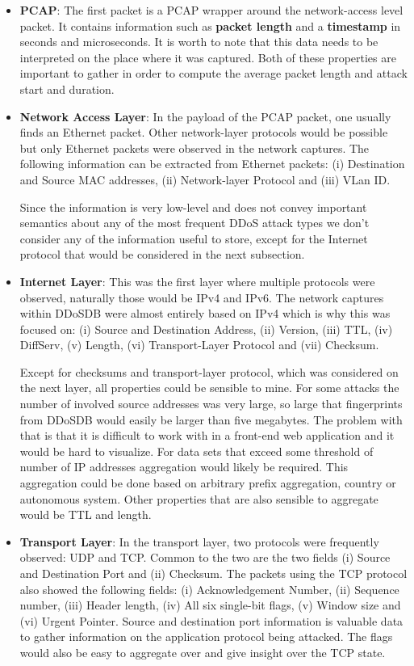 \begin{itemize}
\item \textbf{PCAP}:
The first packet is a PCAP wrapper around the network-access level packet. It contains information such as \textbf{packet length} and a \textbf{timestamp} in seconds and microseconds. It is worth to note that this data needs to be interpreted on the place where it was captured.
Both of these properties are important to gather in order to compute the average packet length and attack start and duration.

\item \textbf{Network Access Layer}: 
In the payload of the PCAP packet, one usually finds an Ethernet packet. Other network-layer protocols would be possible but only Ethernet packets were observed in the network captures.
The following information can be extracted from Ethernet packets:
(i) Destination and Source MAC addresses, (ii) Network-layer Protocol and (iii) VLan ID.

Since the information is very low-level and does not convey important semantics about any of the most frequent DDoS attack types we don't consider any of the information useful to store, except for the Internet protocol that would be considered in the next subsection.


\item \textbf{Internet Layer}: 
This was the first layer where multiple protocols were observed, naturally those would be IPv4 and IPv6. The network captures within DDoSDB were almost entirely based on IPv4 which is why this was focused on:
(i) Source and Destination Address, (ii) Version, (iii) TTL, (iv) DiffServ, (v) Length, (vi) Transport-Layer Protocol and (vii) Checksum.

Except for checksums and transport-layer protocol, which was considered on the next layer, all properties could be sensible to mine.
For some attacks the number of involved source addresses was very large, so large that fingerprints from DDoSDB would easily be larger than five megabytes. The problem with that is that it is difficult to work with in a front-end web application and it would be hard to visualize. For data sets that exceed some threshold of number of IP addresses aggregation would likely be required. This aggregation could be done based on arbitrary prefix aggregation, country or autonomous system.
Other properties that are also sensible to aggregate would be TTL and length.

\item \textbf{Transport Layer}: 
In the transport layer, two protocols were frequently observed: UDP and TCP.
Common to the two are the two fields (i) Source and Destination Port and (ii) Checksum.
The packets using the TCP protocol also showed the following fields: (i) Acknowledgement Number, (ii) Sequence number, (iii) Header length, (iv) All six single-bit flags, (v) Window size and (vi) Urgent Pointer.
Source and destination port information is valuable data to gather information on the application protocol being attacked. The flags would also be easy to aggregate over and give insight over the TCP state.

\end{itemize}


